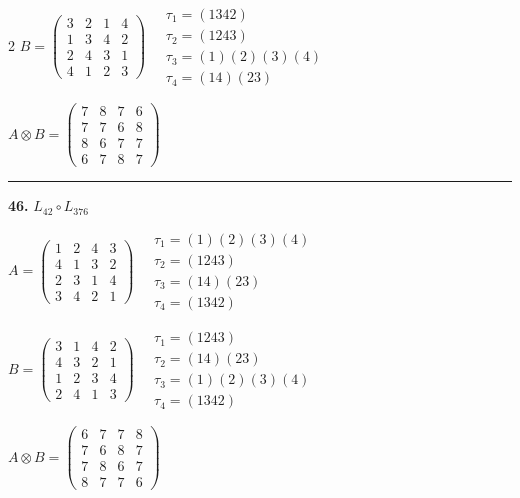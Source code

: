 \begin{multicols}{2}
$B = \begin{pmatrix} 3 & 2 & 1 & 4 \\ 1 & 3 & 4 & 2 \\ 2 & 4 & 3 & 1 \\ 4 & 1 & 2 & 3 \end{pmatrix} \quad \begin{matrix} \tau_{1}=(1 3 4 2) \\ \tau_{2}=(1 2 4 3) \\ \tau_{3}=(1)(2)(3)(4) \\ \tau_{4}=(1 4)(2 3) \end{matrix}$

$A \otimes B = \begin{pmatrix} 7 & 8 & 7 & 6 \\ 7 & 7 & 6 & 8 \\ 8 & 6 & 7 & 7 \\ 6 & 7 & 8 & 7 \end{pmatrix}$

\vspace{0.3em}
\hrule
\vspace{0.3em}

\noindent\textbf{46.} $L_{42} \circ L_{376}$

$A = \begin{pmatrix} 1 & 2 & 4 & 3 \\ 4 & 1 & 3 & 2 \\ 2 & 3 & 1 & 4 \\ 3 & 4 & 2 & 1 \end{pmatrix} \quad \begin{matrix} \tau_{1}=(1)(2)(3)(4) \\ \tau_{2}=(1 2 4 3) \\ \tau_{3}=(1 4)(2 3) \\ \tau_{4}=(1 3 4 2) \end{matrix}$

$B = \begin{pmatrix} 3 & 1 & 4 & 2 \\ 4 & 3 & 2 & 1 \\ 1 & 2 & 3 & 4 \\ 2 & 4 & 1 & 3 \end{pmatrix} \quad \begin{matrix} \tau_{1}=(1 2 4 3) \\ \tau_{2}=(1 4)(2 3) \\ \tau_{3}=(1)(2)(3)(4) \\ \tau_{4}=(1 3 4 2) \end{matrix}$

$A \otimes B = \begin{pmatrix} 6 & 7 & 7 & 8 \\ 7 & 6 & 8 & 7 \\ 7 & 8 & 6 & 7 \\ 8 & 7 & 7 & 6 \end{pmatrix}$


\end{multicols}
